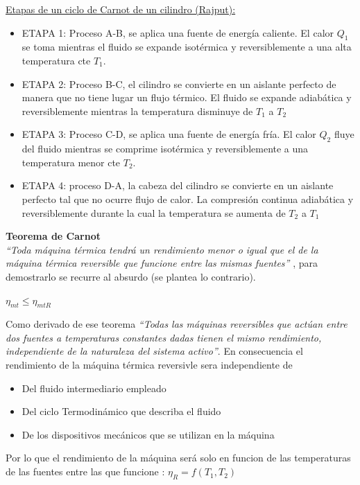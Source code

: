 \documentclass[11pt,a4paper,twocolumn]{article}
\begin{document}
	\newpage
	\underline{Etapas de un ciclo de Carnot de un cilindro (Rajput):}
	\begin{itemize}
		\item ETAPA 1: Proceso A-B, se aplica una fuente de energía caliente. El calor $Q_{1}$  se toma mientras el fluido se expande isotérmica y reversiblemente a una alta temperatura cte $T_{1}$.
		\item ETAPA 2: Proceso B-C, el cilindro se convierte en un aislante perfecto de manera que no tiene lugar un flujo térmico. El fluido se expande adiabática y reversiblemente mientras la temperatura disminuye de $T_{1}$ a $T_{2}$ 
		\item ETAPA 3: Proceso C-D, se aplica una fuente de energía fría. El calor $Q_{2}$ fluye del fluido mientras se comprime isotérmica y reversiblemente a una temperatura menor cte $T_{2}$.
		\item ETAPA 4: proceso D-A, la cabeza del cilindro se convierte en un aislante perfecto tal que no ocurre flujo de calor. La compresión continua adiabática y reversiblemente durante la cual la temperatura se aumenta de $T_{2}$ a $T_{1}$
	\end{itemize}
	
	
	
	
	\textbf{Teorema de Carnot}\\
	\textit{``Toda máquina térmica tendrá un rendimiento menor o igual que el de la máquina térmica reversible que funcione entre las mismas fuentes''} , para demostrarlo se recurre al absurdo (se plantea lo contrario).
	\begin{center}
		$\eta_{mt}\leq \eta_{mtR}$
	\end{center}
	Como derivado de ese teorema \textit{``Todas las máquinas reversibles que actúan entre dos fuentes a temperaturas constantes dadas tienen el mismo rendimiento, independiente de la naturaleza del sistema activo''}. En consecuencia el rendimiento de la máquina térmica reversivle sera independiente de 
	\begin{itemize}
		\item Del fluido intermediario empleado
		\item Del ciclo Termodinámico que describa el fluido
		\item De los dispositivos mecánicos que se utilizan en la máquina
	\end{itemize}

	Por lo que el rendimiento de la máquina será solo en funcion de las temperaturas de las fuentes entre las que funcione : $\eta_{R}=f(T_{1},T_{2})$
	\newpage
	
\end{document}

